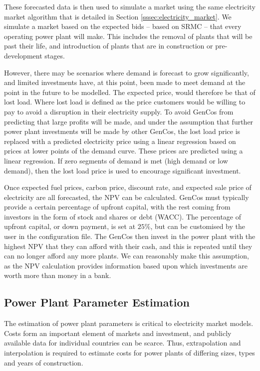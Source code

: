 These forecasted data is then used to simulate a market using the same electricity market algorithm that is detailed in Section \ref{sssec:electricity_market}. We simulate a market based on the expected bids -- based on SRMC -- that every operating power plant will make. This includes the removal of plants that will be past their life, and introduction of plants that are in construction or pre-development stages. 

However, there may be scenarios where demand is forecast to grow significantly, and limited investments have, at this point, been made to meet demand at the point in the future to be modelled. The expected price, would therefore be that of lost load. Where lost load is defined as the price customers would be willing to pay to avoid a disruption in their electricity supply. To avoid GenCos from predicting that large profits will be made, and under the assumption that further power plant investments will be made by other GenCos, the lost load price is replaced with a predicted electricity price using a linear regression based on prices at lower points of the demand curve. These prices are predicted using a linear regression. If zero segments of demand is met (high demand or low demand), then the lost load price is used to encourage significant investment.

Once expected fuel prices, carbon price, discount rate, and expected sale price of electricity are all forecasted, the NPV can be calculated. GenCos must typically provide a certain percentage of upfront capital, with the rest coming from investors in the form of stock and shares or debt (WACC). The percentage of upfront capital, or down payment, is set at $25\%$, but can be customised by the user in the configuration file. The GenCos then invest in the power plant with the highest NPV that they can afford with their cash, and this is repeated until they can no longer afford any more plants. We can reasonably make this assumption, as the NPV calculation provides information based upon which investments are worth more than money in a bank.

\subsection{Power Plant Parameter Estimation}



The estimation of power plant parameters is critical to electricity market models. Costs form an important element of markets and investment, and publicly available data for individual countries can be scarce. Thus, extrapolation and interpolation is required to estimate costs for power plants of differing sizes, types and years of construction.



